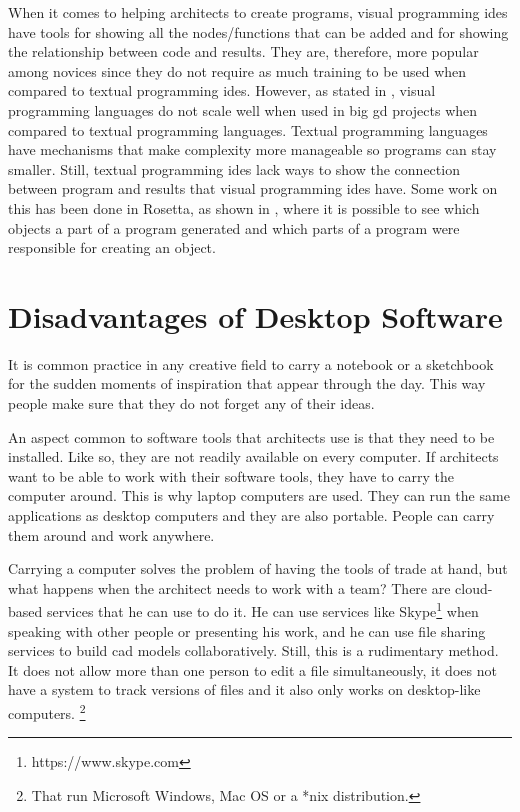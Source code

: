 When it comes to helping architects to create programs, visual programming \glspl{ide} have tools for showing all the nodes/functions that can be added and for showing the relationship between code and results.
They are, therefore, more popular among novices since they do not require as much training to be used when compared to textual programming \glspl{ide}.
However, as stated in \cite{leitao2012programming}, visual programming languages do not scale well when used in big \gls{gd} projects when compared to textual programming languages.
Textual programming languages have mechanisms that make complexity more manageable so programs can stay smaller.
Still, textual programming \glspl{ide} lack ways to show the connection between program and results that visual programming \glspl{ide} have.
Some work on this has been done in Rosetta, as shown in \cite{de2012modern}, where it is possible to see which objects a part of a program generated and which parts of a program were responsible for creating an object.


\section{Disadvantages of Desktop Software}
It is common practice in any creative field to carry a notebook or a sketchbook for the sudden moments of inspiration that appear through the day.
This way people make sure that they do not forget any of their ideas.

An aspect common to software tools that architects use is that they need to be installed.
Like so, they are not readily available on every computer.
If architects want to be able to work with their software tools, they have to carry the computer around.
This is why laptop computers are used.
They can run the same applications as desktop computers and they are also portable.
People can carry them around and work anywhere.

Carrying a computer solves the problem of having the tools of trade at hand, but what happens when the architect needs to work with a team?
There are cloud-based services that he can use to do it.
He can use services like Skype\footnote{https://www.skype.com} when speaking with other people or presenting his work, and he can use file sharing services to build \gls{cad} models collaboratively.
Still, this is a rudimentary method.
It does not allow more than one person to edit a file simultaneously, it does not have a system to track versions of files and it also only works on desktop-like computers.%
\footnote{That run Microsoft Windows, Mac OS or a *nix distribution.}


